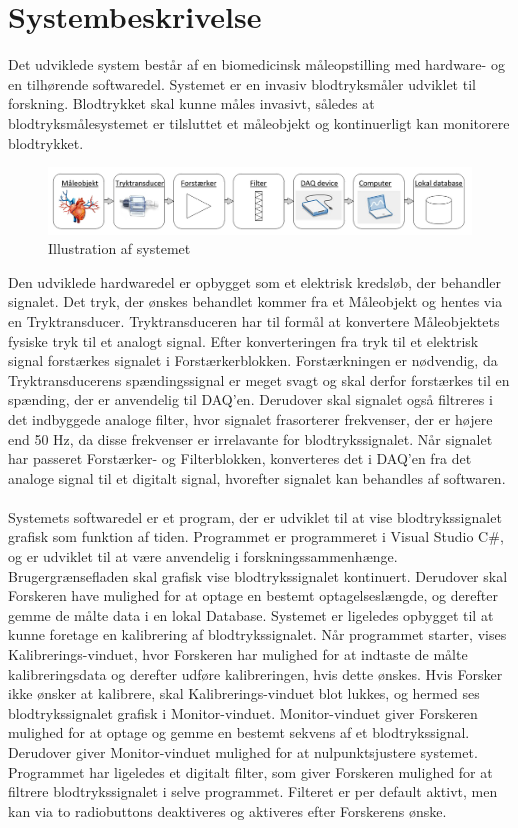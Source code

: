 \chapter{Systembeskrivelse}
Det udviklede system består af en biomedicinsk måleopstilling med hardware- og en tilhørende softwaredel. Systemet er en invasiv blodtryksmåler udviklet til forskning. Blodtrykket skal kunne måles invasivt, således at blodtryksmålesystemet er tilsluttet et måleobjekt og kontinuerligt kan monitorere blodtrykket. 

\begin{figure}[H]
	\centering
	\includegraphics[width=1\textwidth]{Figurer/Snip20151209_73}
	\caption{Illustration af systemet}
\end{figure}

Den udviklede hardwaredel er opbygget som et elektrisk kredsløb, der behandler signalet. Det tryk, der ønskes behandlet kommer fra et Måleobjekt og hentes via en Tryktransducer. Tryktransduceren har til formål at konvertere Måleobjektets fysiske tryk til et analogt signal. Efter konverteringen fra tryk til et elektrisk signal forstærkes signalet i Forstærkerblokken. Forstærkningen er nødvendig, da Tryktransducerens spændingssignal er meget svagt og skal derfor forstærkes til en spænding, der er anvendelig til DAQ’en. Derudover skal signalet også filtreres i det indbyggede analoge filter, hvor signalet frasorterer frekvenser, der er højere end 50 Hz, da disse frekvenser er irrelavante for blodtrykssignalet. Når signalet har passeret Forstærker- og Filterblokken, konverteres det i DAQ’en fra det analoge signal til et digitalt signal, hvorefter signalet kan behandles af softwaren. \\\\
Systemets softwaredel er et program, der er udviklet til at vise blodtrykssignalet grafisk som funktion af tiden. Programmet er programmeret i Visual Studio C\#, og er udviklet til at være anvendelig i forskningssammenhænge. Brugergrænsefladen skal grafisk vise blodtrykssignalet kontinuert. Derudover skal Forskeren have mulighed for at optage en bestemt optagelseslængde, og derefter gemme de målte data i en lokal Database. Systemet er ligeledes opbygget til at kunne foretage en kalibrering af blodtrykssignalet. Når programmet starter, vises Kalibrerings-vinduet, hvor Forskeren har mulighed for at indtaste de målte kalibreringsdata og derefter udføre kalibreringen, hvis dette ønskes. Hvis Forsker ikke ønsker at kalibrere, skal Kalibrerings-vinduet blot lukkes, og hermed ses blodtrykssignalet grafisk i Monitor-vinduet. Monitor-vinduet giver Forskeren mulighed for at optage og  gemme en bestemt sekvens af et blodtrykssignal. Derudover giver Monitor-vinduet mulighed for at nulpunktsjustere systemet. Programmet har ligeledes et digitalt filter, som giver Forskeren mulighed for at filtrere blodtrykssignalet i selve programmet. Filteret er per default aktivt, men kan via to radiobuttons deaktiveres og aktiveres efter Forskerens ønske. 